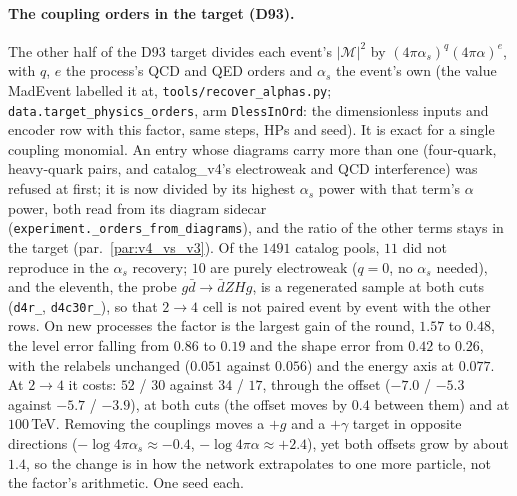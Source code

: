 \documentclass[11pt]{article}
\newcommand{\code}[1]{\texttt{#1}}
\begin{document}
\paragraph{The coupling orders in the target (D93).}\label{par:dimless_orders} The other half of the D93 target divides each
event's $|\mathcal M|^2$ by $(4\pi\alpha_s)^q(4\pi\alpha)^e$, with $q$, $e$ the process's QCD and QED orders and $\alpha_s$
the event's own (the value MadEvent labelled it at, \code{tools/recover\_alphas.py}; \code{data.target\_physics\_orders},
arm \code{DlessInOrd}: the dimensionless inputs and encoder row with this factor, same steps, HPs and seed). It is exact
for a single coupling monomial. An entry whose diagrams carry more than one (four-quark, heavy-quark pairs, and
catalog\_v4's electroweak and QCD interference) was refused at first; it is now divided by its highest $\alpha_s$
power with that term's $\alpha$ power, both read from its diagram sidecar (\code{experiment.\_orders\_from\_diagrams}),
and the ratio of the other terms stays in the target (par.~\ref{par:v4_vs_v3}). Of the $1491$ catalog pools, $11$ did not reproduce in the $\alpha_s$ recovery; $10$ are purely
electroweak ($q=0$, no $\alpha_s$ needed), and the eleventh, the probe $g\bar d\to\bar dZHg$, is a regenerated sample at
both cuts (\code{d4r\_}, \code{d4c30r\_}), so that $2\to4$ cell is not paired event by event with the other rows. On new
processes the factor is the largest gain of the round, $1.57$ to $0.48$, the level error falling from $0.86$ to $0.19$
and the shape error from $0.42$ to $0.26$, with the relabels unchanged ($0.051$ against $0.056$) and the energy axis at
$0.077$. At $2\to4$ it costs: $52$ / $30$ against $34$ / $17$, through the offset ($-7.0$ / $-5.3$ against $-5.7$ / $-3.9$),
at both cuts (the offset moves by $0.4$ between them) and at $100$\,TeV. Removing the couplings moves a $+g$ and a $+\gamma$
target in opposite directions ($-\log 4\pi\alpha_s\approx-0.4$, $-\log 4\pi\alpha\approx+2.4$), yet both offsets grow by
about $1.4$, so the change is in how the network extrapolates to one more particle, not the factor's arithmetic. One seed
each.
\end{document}
